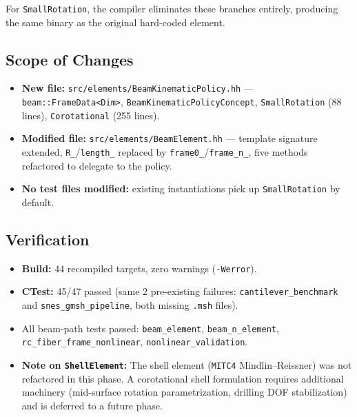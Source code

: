 \noindent
For \texttt{SmallRotation}, the compiler eliminates these branches
entirely, producing the same binary as the original hard-coded
element.

\subsection{Scope of Changes}

\begin{itemize}
  \item \textbf{New file:}
    \texttt{src/elements/BeamKinematicPolicy.hh} ---
    \texttt{beam::FrameData<Dim>},
    \texttt{BeamKinematicPolicyConcept},
    \texttt{SmallRotation} (88 lines),
    \texttt{Corotational} (255 lines).

  \item \textbf{Modified file:}
    \texttt{src/elements/BeamElement.hh} ---
    template signature extended, \texttt{R\_}/\texttt{length\_}
    replaced by \texttt{frame0\_}/\texttt{frame\_n\_}, five methods
    refactored to delegate to the policy.

  \item \textbf{No test files modified:} existing instantiations
    pick up \texttt{SmallRotation} by default.
\end{itemize}

\subsection{Verification}

\begin{itemize}
  \item \textbf{Build:} 44 recompiled targets, zero warnings
        (\texttt{-Werror}).
  \item \textbf{CTest:} 45/47 passed (same 2 pre-existing failures:
        \texttt{cantilever\_benchmark} and
        \texttt{snes\_gmsh\_pipeline}, both missing \texttt{.msh}
        files).
  \item All beam-path tests passed:
        \texttt{beam\_element},
        \texttt{beam\_n\_element},
        \texttt{rc\_fiber\_frame\_nonlinear},
        \texttt{nonlinear\_validation}.

  \item \textbf{Note on \texttt{ShellElement}:}
    The shell element (\texttt{MITC4} Mindlin--Reissner) was not
    refactored in this phase.  A corotational shell formulation
    requires additional machinery (mid-surface rotation
    parametrization, drilling DOF stabilization) and is deferred to
    a future phase.
\end{itemize}


